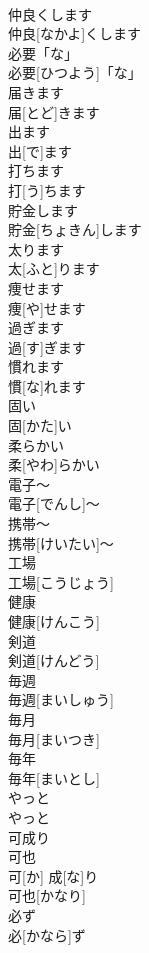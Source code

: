 \documentclass[8pt]{extreport}
\begin{document}
\begin{CJK}{UTF8}{min}
\\	仲良くします	
\\	仲良[なかよ]くします	
\\	必要「な」	
\\	必要[ひつよう]「な」	
\\	届きます	
\\	届[とど]きます	
\\	出ます 
\\	出[で]ます 
\\	打ちます	
\\	打[う]ちます	
\\	貯金します	
\\	貯金[ちょきん]します	
\\	太ります	
\\	太[ふと]ります	
\\	痩せます	
\\	痩[や]せます	
\\	過ぎます	
\\	過[す]ぎます	
\\	慣れます	
\\	慣[な]れます	
\\	固い	
\\	固[かた]い	
\\	柔らかい	
\\	柔[やわ]らかい	
\\	電子〜	
\\	電子[でんし]〜	
\\	携帯〜	
\\	携帯[けいたい]〜	
\\	工場	
\\	工場[こうじょう]	
\\	健康	
\\	健康[けんこう]	
\\	剣道	
\\	剣道[けんどう]	
\\	毎週	
\\	毎週[まいしゅう]	
\\	毎月	
\\	毎月[まいつき]	
\\	毎年	
\\	毎年[まいとし]	
\\	やっと	
\\	やっと	
\\	可成り
\\	可也	
\\	可[か] 成[な]り
\\	可也[かなり]	
\\	必ず	
\\	必[かなら]ず	

\end{CJK}
\end{document}
